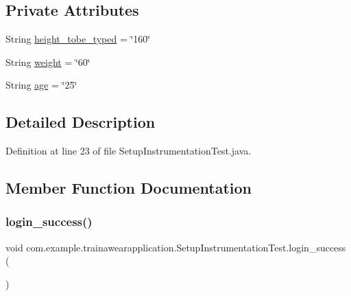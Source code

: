 \subsection*{Private Attributes}
\begin{DoxyCompactItemize}
\item 
String \mbox{\hyperlink{classcom_1_1example_1_1trainawearapplication_1_1_setup_instrumentation_test_a969cc5898cf6bdc58207c1944f573a78}{height\+\_\+tobe\+\_\+typed}} = \char`\"{}160\char`\"{}
\item 
String \mbox{\hyperlink{classcom_1_1example_1_1trainawearapplication_1_1_setup_instrumentation_test_a09706ee1f2c90e4a5ea3edb460714adb}{weight}} = \char`\"{}60\char`\"{}
\item 
String \mbox{\hyperlink{classcom_1_1example_1_1trainawearapplication_1_1_setup_instrumentation_test_a8c73f8c3f826243e4d875a7e5a9898ff}{age}} = \char`\"{}25\char`\"{}
\end{DoxyCompactItemize}


\subsection{Detailed Description}


Definition at line 23 of file Setup\+Instrumentation\+Test.\+java.



\subsection{Member Function Documentation}
\mbox{\label{classcom_1_1example_1_1trainawearapplication_1_1_setup_instrumentation_test_a4dbc2cfc0d101616f6c60f075bc55d58}} 
\subsubsection{\texorpdfstring{login\_success()}{login\_success()}}
{\footnotesize\ttfamily void com.\+example.\+trainawearapplication.\+Setup\+Instrumentation\+Test.\+login\+\_\+success (\begin{DoxyParamCaption}{ }\end{DoxyParamCaption})}



